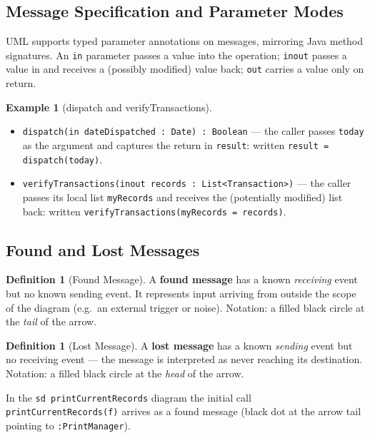 \documentclass[11pt, a4paper, notitlepage]{report}
\theoremstyle{definition}
\newtheorem{definition}[theorem]{Definition}
\theoremstyle{remark}
\theoremstyle{definition}
\newtheorem{example}[theorem]{Example}
\begin{document}
\subsection{Message Specification and Parameter Modes}
\label{subsec:ch7-msg-spec}

UML supports typed parameter annotations on messages, mirroring Java method
signatures. An \texttt{in} parameter passes a value into the operation;
\texttt{inout} passes a value in and receives a (possibly modified) value back;
\texttt{out} carries a value only on return.

\begin{example}[dispatch and verifyTransactions]
\label{ex:ch7-msg-spec}
\begin{itemize}
  \item \texttt{dispatch(in dateDispatched : Date) : Boolean} --- the caller
        passes \texttt{today} as the argument and captures the return in
        \texttt{result}: written \texttt{result = dispatch(today)}.
  \item \texttt{verifyTransactions(inout records : List<Transaction>)} --- the
        caller passes its local list \texttt{myRecords} and receives the
        (potentially modified) list back: written
        \texttt{verifyTransactions(myRecords = records)}.
\end{itemize}
\end{example}

\subsection{Found and Lost Messages}
\label{subsec:ch7-found-lost}

\begin{definition}[Found Message]
\label{def:ch7-found}
A \textbf{found message} has a known \emph{receiving} event but no known
sending event. It represents input arriving from outside the scope of the
diagram (e.g.\ an external trigger or noise). Notation: a filled black circle
at the \emph{tail} of the arrow.
\end{definition}

\begin{definition}[Lost Message]
\label{def:ch7-lost}
A \textbf{lost message} has a known \emph{sending} event but no receiving event
--- the message is interpreted as never reaching its destination. Notation: a
filled black circle at the \emph{head} of the arrow.
\end{definition}

In the \texttt{sd printCurrentRecords} diagram the initial call
\texttt{printCurrentRecords(f)} arrives as a found message (black dot at the
arrow tail pointing to \texttt{:PrintManager}).
\end{document}
